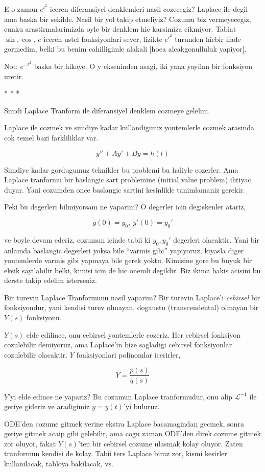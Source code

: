 \documentclass[12pt,fleqn]{article}\usepackage{../common}
\begin{document}
E o zaman $e^{t^2}$ iceren diferansiyel denklemleri nasil cozecegiz?
Laplace ile degil ama baska bir sekilde. Nasil bir yol takip etmeliyiz?
Cozumu biz vermeyecegiz, cunku arastirmalarimizda oyle bir denklem hic
karsimiza cikmiyor. Tabiat $\sin, \cos$, $e$ iceren ustel fonksiyonlari
sever, fizikte $e^{t^2}$ turunden hicbir ifade gormedim, belki bu benim
cahilligimle alakali [hoca alcakgonulluluk yapiyor]. 

Not: $e^{-t^2}$ baska bir hikaye. O y ekseninden asagi, iki yana yayilan bir
fonksiyon uretir. 

* * * 

Simdi Laplace Tranform ile diferansiyel denklem cozmeye gelelim. 

Laplace ile cozmek ve simdiye kadar kullandigimiz yontemlerle cozmek
arasinda cok temel bazi farkliliklar var. 

\[ y'' + Ay' + By = h(t) \]

Simdiye kadar gordugumuz teknikler bu problemi bu haliyle cozerler. Ama
Laplace tranformu bir baslangic sart problemine (initial value problem)
ihtiyac duyar. Yani cozumden once baslangic sartini kesinlikle tanimlamaniz
gerekir. 

Peki bu degerleri bilmiyorsam ne yaparim? O degerler icin degiskenler
atariz, 

\[ y(0) = y_0, \ y'(0) = y_0' \]

ve boyle devam ederiz, cozumun icinde tabii ki $y_0,y_0'$ degerleri
olacaktir. Yani bir anlamda baslangic degerleri yoksa bile ``varmis gibi''
yapiyoruz, kiyasla diger yontemlerde varmis gibi yapmaya bile gerek
yoktu. Kimisine gore bu buyuk bir eksik sayilabilir belki, kimisi icin de
hic onemli degildir. Biz ikinci bakis acisini bu derste takip edelim
isterseniz.

Bir turevin Laplace Tranformunu nasil yaparim? Bir turevin Laplace'i
{\em cebirsel} bir fonksiyondur, yani kendisi turev olmayan, dogaustu
(transcendental) olmayan bir $Y(s)$ fonksiyonu. 

$Y(s)$ elde edilince, onu cebirsel yontemlerle cozeriz. Her cebirsel
fonksiyon cozulebilir demiyoruz, ama Laplace'in bize sagladigi cebirsel
fonksiyonlar cozulebilir olacaktir. $Y$ fonksiyonlari polinomlar icerirler, 

\[ Y = \frac{p(s)}{q(s)} \]

$Y$'yi elde edince ne yapariz? Bu cozumun Laplace tranformudur, onu alip
$\mathcal{L}^{-1}$ ile geriye gideriz ve aradigimiz $y = y(t)$'yi buluruz. 

ODE'den cozume gitmek yerine ekstra Laplace basamagindan gecmek, sonra
geriye gitmek acaip gibi gelebilir, ama cogu zaman ODE'den direk cozume
gitmek zor oluyor, fakat $Y(s)$'ten bir cebirsel cozume ulasmak kolay
oluyor. Zaten tranformun kendisi de kolay. Tabii ters Laplace biraz zor,
kismi kesirler kullanilacak, tabloya bakilacak, vs. 
\end{document}
